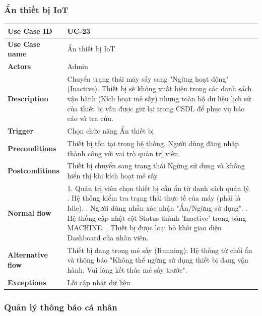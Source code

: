 \subsubsection{Ẩn thiết bị IoT}
\begin{tabular}{|p{3.5cm}|p{9.5cm}|}
\hline
\textbf{Use Case ID} & UC-23 \\
\hline
\textbf{Use Case name} & Ẩn thiết bị IoT \\
\hline
\textbf{Actors} & Admin \\
\hline
\textbf{Description} & 
Chuyển trạng thái máy sấy sang "Ngừng hoạt động" (Inactive). Thiết bị sẽ không xuất hiện trong các danh sách vận hành (Kích hoạt mẻ sấy) nhưng toàn bộ dữ liệu lịch sử của thiết bị vẫn được giữ lại trong CSDL để phục vụ báo cáo và tra cứu. \\
\hline
\textbf{Trigger} & Chọn chức năng Ẩn thiết bị \\
\hline
\textbf{Preconditions} & Thiết bị tồn tại trong hệ thống. Người dùng đăng nhập thành công với vai trò quản trị viên. \\
\hline
\textbf{Postconditions} & Thiết bị chuyển sang trạng thái Ngừng sử dụng và không hiển thị khi kích hoạt mẻ sấy \\
\hline
\textbf{Normal flow} & 
1. Quản trị viên chọn thiết bị cần ẩn từ danh sách quản lý. \newline
2. Hệ thống kiểm tra trạng thái thực tế của máy (phải là Idle). \newline
3. Người dùng nhấn xác nhận "Ẩn/Ngừng sử dụng". \newline
4. Hệ thống cập nhật cột Status thành 'Inactive' trong bảng MACHINE. \newline
5. Thiết bị được loại bỏ khỏi giao diện Dashboard của nhân viên. \\
\hline
\textbf{Alternative flow} & 

Thiết bị đang trong mẻ sấy (Running): Hệ thống từ chối ẩn và thông báo "Không thể ngừng sử dụng thiết bị đang vận hành. Vui lòng kết thúc mẻ sấy trước".\\
\hline
\textbf{Exceptions} & Lỗi cập nhật dữ liệu \\
\hline
\end{tabular}

\subsubsection{Quản lý thông báo cá nhân}

